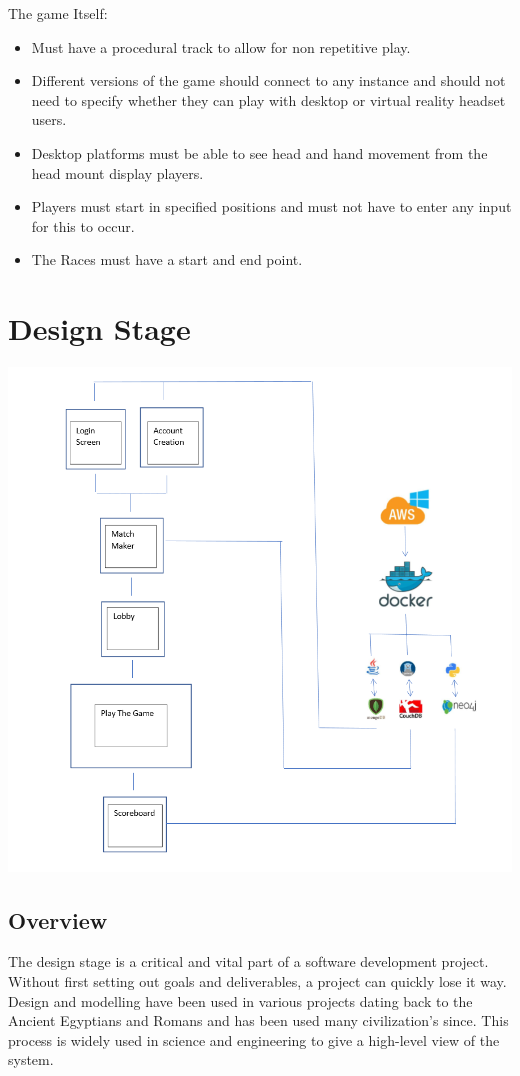 The game Itself:
\begin{itemize}
\item Must have a procedural track to allow for non repetitive play.
\item Different versions of the game should connect to any instance and should not need to specify whether they can play with desktop or virtual reality headset users.
\item Desktop platforms must be able to see head and hand movement from the head mount display players.
\item Players must start in specified positions and must not have to enter any input for this to occur.
\item The Races must have a start and end point.
\end{itemize}

\newpage
\section{Design Stage}

\includegraphics[width=1\columnwidth]{img/Overview.PNG}
\subsection {Overview}
The design stage is a critical and vital part of a software development project. Without first setting out goals and deliverables, a project can quickly lose it way. Design and modelling have been used in various projects dating back to the Ancient Egyptians and Romans and has been used many civilization's since. This process is widely used in science and engineering to give a high-level view of the system.
\newline

